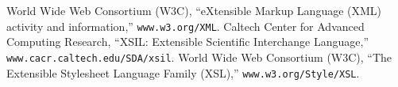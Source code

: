 \documentclass[12pt]{iopart}
\begin{document}
\begin{thebibliography}{10}
 World Wide Web Consortium (W3C), ``eXtensible Markup Language (XML) activity and information,'' \texttt{www.w3.org/XML}.
 Caltech Center for Advanced Computing Research, ``XSIL: Extensible Scientific Interchange Language,'' \texttt{www.cacr.caltech.edu/SDA/xsil}.
 World Wide Web Consortium (W3C), ``The Extensible Stylesheet Language Family (XSL),'' \texttt{www.w3.org/Style/XSL}.



\end{thebibliography}
\end{document}
